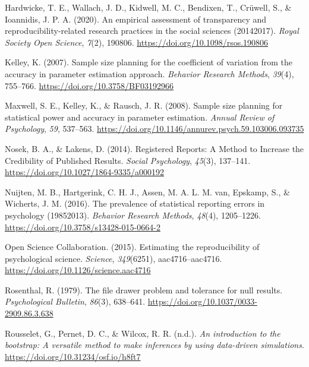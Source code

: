 \documentclass[
  man]{apa6}
\newlength{\cslhangindent}
\newlength{\cslentryspacingunit} %
\newenvironment{CSLReferences}[2] %
 {%
  \setlength{\parindent}{0pt}
  \ifodd #1
  \let\oldpar\par
  \def\par{\hangindent=\cslhangindent\oldpar}
  \fi
  \setlength{\parskip}{#2\cslentryspacingunit}
 }%
 {}
\begin{document}
\begin{CSLReferences}{1}{0}
\leavevmode{}%
Hardwicke, T. E., Wallach, J. D., Kidwell, M. C., Bendixen, T., Crüwell, S., \& Ioannidis, J. P. A. (2020). An empirical assessment of transparency and reproducibility-related research practices in the social sciences (2014{\textendash}2017). \emph{Royal Society Open Science}, \emph{7}(2), 190806. \url{https://doi.org/10.1098/rsos.190806}

\leavevmode{}%
Kelley, K. (2007). Sample size planning for the coefficient of variation from the accuracy in parameter estimation approach. \emph{Behavior Research Methods}, \emph{39}(4), 755--766. \url{https://doi.org/10.3758/BF03192966}

\leavevmode{}%
Maxwell, S. E., Kelley, K., \& Rausch, J. R. (2008). Sample size planning for statistical power and accuracy in parameter estimation. \emph{Annual Review of Psychology}, \emph{59}, 537--563. \url{https://doi.org/10.1146/annurev.psych.59.103006.093735}

\leavevmode{}%
Nosek, B. A., \& Lakens, D. (2014). Registered Reports: A Method to Increase the Credibility of Published Results. \emph{Social Psychology}, \emph{45}(3), 137--141. \url{https://doi.org/10.1027/1864-9335/a000192}

\leavevmode{}%
Nuijten, M. B., Hartgerink, C. H. J., Assen, M. A. L. M. van, Epskamp, S., \& Wicherts, J. M. (2016). The prevalence of statistical reporting errors in psychology (1985{\textendash}2013). \emph{Behavior Research Methods}, \emph{48}(4), 1205--1226. \url{https://doi.org/10.3758/s13428-015-0664-2}

\leavevmode{}%
Open Science Collaboration. (2015). Estimating the reproducibility of psychological science. \emph{Science}, \emph{349}(6251), aac4716--aac4716. \url{https://doi.org/10.1126/science.aac4716}

\leavevmode{}%
Rosenthal, R. (1979). The file drawer problem and tolerance for null results. \emph{Psychological Bulletin}, \emph{86}(3), 638--641. \url{https://doi.org/10.1037/0033-2909.86.3.638}

\leavevmode{}%
Rousselet, G., Pernet, D. C., \& Wilcox, R. R. (n.d.). \emph{An introduction to the bootstrap: A versatile method to make inferences by using data-driven simulations}. \url{https://doi.org/10.31234/osf.io/h8ft7}


\end{CSLReferences}
\end{document}

